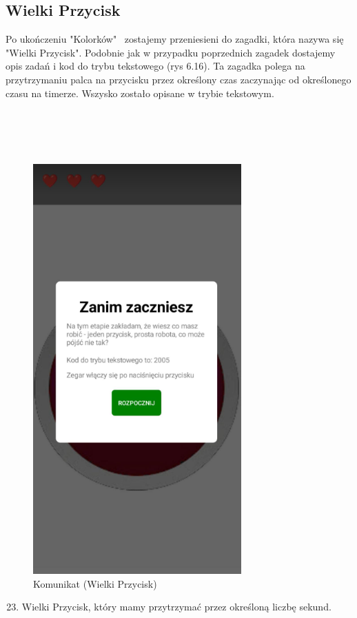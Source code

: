\subsection{Wielki Przycisk}
Po ukończeniu "Kolorków"~ zostajemy przeniesieni do zagadki, która nazywa się "Wielki Przycisk". Podobnie jak w przypadku poprzednich zagadek dostajemy opis zadań i kod do trybu tekstowego (rys 6.16). Ta zagadka polega na przytrzymaniu palca na przycisku przez określony czas zaczynając od określonego czasu na timerze. Wszysko zostało opisane w trybie tekstowym.
\\
\\
\\
\\
\\
	\begin{figure}[!htb]
	\begin{center}
		\includegraphics[width=8cm]{rys/opis11.png}
		\caption{Komunikat (Wielki Przycisk)}
		\label{rys:rysunek001}
	\end{center}
\end{figure}
\begin{enumerate}
	\setcounter{enumi}{22}
	\item Wielki Przycisk, który mamy przytrzymać przez określoną liczbę sekund.
	\\
	\\
	\\
	\\
	\\
	\\
	\\
	\\
	\\
\end{enumerate}
